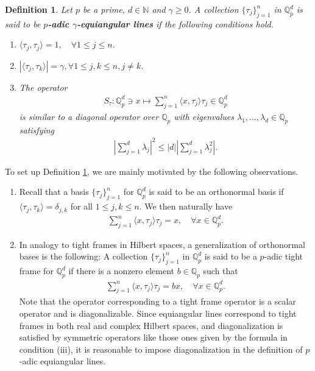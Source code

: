\documentclass{amsart}
\newtheorem{definition}[theorem]{Definition}
\begin{document}
\begin{definition}\label{EL}
		Let $p$ be a prime, $d \in \mathbb{N}$ and $\gamma \geq0$. A collection $\{\tau_j\}_{j=1}^n$  in $\mathbb{Q}_p^d$	is said to be \textbf{$p$-adic $\gamma$-equiangular  lines} if the following conditions hold.
	\begin{enumerate}[\upshape(i)]
		\item $\langle \tau_j, \tau_j\rangle =1, \quad \forall 1\leq j \leq n$.
		\item $	|\langle \tau_j, \tau_k\rangle| =\gamma, \forall 1\leq j, k \leq n, j \neq k$.
		\item The operator 
		\begin{align*}
			S_\tau : \mathbb{Q}_p^d\ni x \mapsto \sum_{j=1}^n\langle x, \tau_j\rangle \tau_j \in \mathbb{Q}_p^d
		\end{align*}
	is similar  to a diagonal operator over $\mathbb{Q}_p$  with eigenvalues $\lambda_1, \dots, \lambda_d \in \mathbb{Q}_p$ satisfying 
	\begin{align*}
		\left|\sum_{j=1}^{d}\lambda_j\right|^2\leq |d| \left|\sum_{j=1}^{d}\lambda_j^2\right|.	
	\end{align*}
	\end{enumerate}
\end{definition}
To set up Definition \ref{EL}, we are mainly motivated by the following observations.
\begin{enumerate}
	\item Recall that  a basis  $\{\tau_j\}_{j=1}^n$  for  $\mathbb{Q}^d_p$ is said to be an orthonormal basis if $\langle \tau_j, \tau_k\rangle =\delta_{j,k}$ for all $1\leq j,k \leq n$. We then naturally have 
	\begin{align*}
		\sum_{j=1}^n\langle x, \tau_j\rangle \tau_j =x, \quad \forall x \in \mathbb{Q}_p^d.
	\end{align*}
\item In analogy to tight frames in Hilbert spaces, a generalization of orthonormal bases is the following:  A collection $\{\tau_j\}_{j=1}^n$  in   $\mathbb{Q}^d_p$ is said to be  a $p$-adic tight frame for $\mathbb{Q}^d_p$  if there is a nonzero element $b \in \mathbb{Q}_p$ such that 
\begin{align*}
	\sum_{j=1}^n\langle x, \tau_j\rangle \tau_j =bx, \quad \forall x \in \mathbb{Q}_p^d.
\end{align*}
Note that the operator corresponding to a tight frame operator is a scalar operator and is diagonalizable. Since equiangular lines correspond to tight frames in both real and complex Hilbert spaces, and diagonalization is satisfied by symmetric operators like those ones given by the formula in condition (iii), it is reasonable to impose diagonalization in the definition of $p$-adic equiangular lines.
\end{enumerate}
\end{document}
